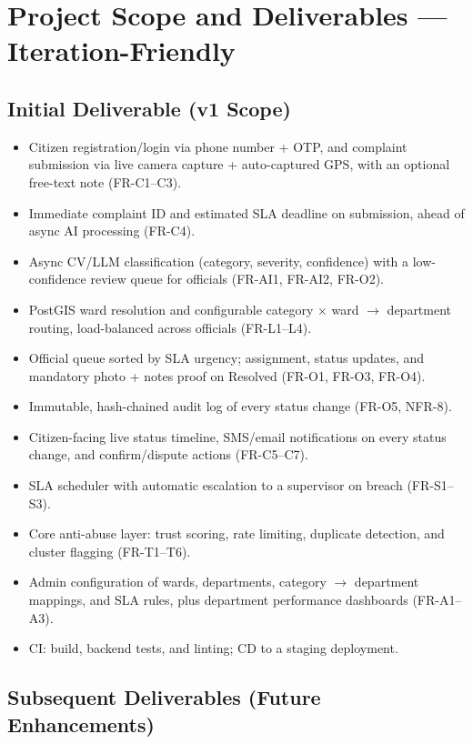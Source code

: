 \documentclass[12pt,a4paper]{article}
\begin{document}
\section{Project Scope and Deliverables --- Iteration-Friendly}

\subsection{Initial Deliverable (v1 Scope)}

\begin{itemize}
    \item Citizen registration/login via phone number + OTP, and complaint submission via live camera capture + auto-captured GPS, with an optional free-text note (FR-C1--C3).
    \item Immediate complaint ID and estimated SLA deadline on submission, ahead of async AI processing (FR-C4).
    \item Async CV/LLM classification (category, severity, confidence) with a low-confidence review queue for officials (FR-AI1, FR-AI2, FR-O2).
    \item PostGIS ward resolution and configurable category $\times$ ward $\rightarrow$ department routing, load-balanced across officials (FR-L1--L4).
    \item Official queue sorted by SLA urgency; assignment, status updates, and mandatory photo + notes proof on Resolved (FR-O1, FR-O3, FR-O4).
    \item Immutable, hash-chained audit log of every status change (FR-O5, NFR-8).
    \item Citizen-facing live status timeline, SMS/email notifications on every status change, and confirm/dispute actions (FR-C5--C7).
    \item SLA scheduler with automatic escalation to a supervisor on breach (FR-S1--S3).
    \item Core anti-abuse layer: trust scoring, rate limiting, duplicate detection, and cluster flagging (FR-T1--T6).
    \item Admin configuration of wards, departments, category $\rightarrow$ department mappings, and SLA rules, plus department performance dashboards (FR-A1--A3).
    \item CI: build, backend tests, and linting; CD to a staging deployment.
\end{itemize}

\subsection{Subsequent Deliverables (Future Enhancements)}
\end{document}

